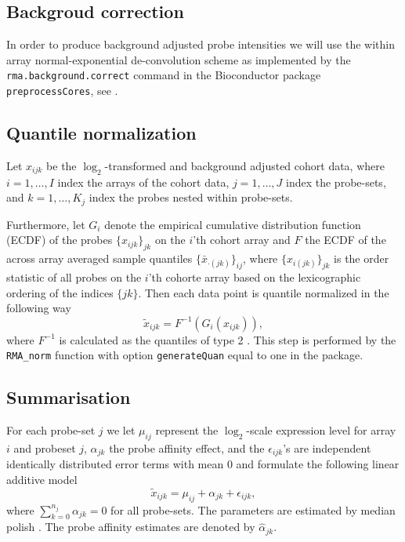 \subsection{Backgroud correction}
In order to produce background adjusted probe intensities we will use the within array normal-exponential de-convolution scheme as implemented by the \texttt{rma.background.correct} command in the Bioconductor package \texttt{preprocessCores}, see
\citep{Irizarry2003b,Bolstad2004}.


\subsection{Quantile normalization}
Let $x_{ijk}$ be the $\log_2$-transformed and background adjusted cohort data, where $i = 1,\dots,I$ index the arrays of the cohort data, $j=1,\dots,J$  index the probe-sets, and $k=1,\dots,K_j$ index the probes nested within probe-sets.

Furthermore, let $G_i$ denote the empirical cumulative distribution function (ECDF) of the probes $\{x_{ijk}\}_{jk}$ on the $i$'th cohort array and $F$ the ECDF of the across array averaged sample quantiles $\{\bar{x}_{\cdot (jk)}\}_{ij}$, where $\{x_{i(jk)}\}_{jk}$ is the order statistic of all probes on the $i$'th cohorte array based on the lexicographic ordering of the indices $\{jk\}$. Then each data point is quantile normalized in the following way
\begin{equation*}
     \tilde{x}_{ijk} = F^{-1}(G_i(x_{ijk})),
\end{equation*}
where $F^{-1}$ is calculated as the quantiles of type 2 \citep{Hyndman1996}.
This step is performed by the \texttt{RMA\_norm} function with option \texttt{generateQuan} equal to one in the \hemaClass{} package.

\subsection{Summarisation}

For each probe-set $j$ we let $\mu_{ij}$ represent the $\log_2$-scale expression level for array $i$ and probeset $j$, $\alpha_{jk}$ the probe affinity effect, and the $\epsilon_{ijk}$'s are independent identically distributed  error terms with mean 0 and formulate the following linear additive model
\begin{equation*}
   \tilde{x}_{ijk} = \mu_{ij} + \alpha_{jk}+ \epsilon_{ijk},
\end{equation*}
where $\sum_{k=0}^{n_j} \alpha_{jk} = 0$ for all probe-sets. The parameters are estimated by median polish \citep{Holder2001}. The probe affinity estimates are denoted by $\hat{\alpha}_{jk}$.

